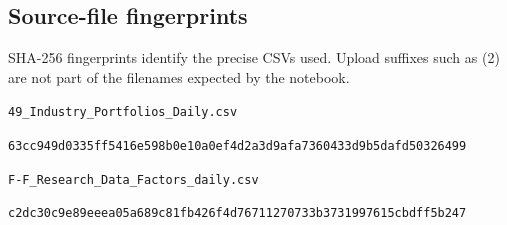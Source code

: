 \documentclass[11pt,a4paper]{article}
\begin{document}
\subsection*{Source-file fingerprints}
SHA-256 fingerprints identify the precise CSVs used. Upload suffixes such as (2) are not part of the filenames expected by the notebook.

{\footnotesize\texttt{49\_Industry\_Portfolios\_Daily.csv}\par\texttt{63cc949d0335ff5416e598b0e10a0ef4}\texttt{d2a3d9afa7360433d9b5dafd50326499}}\par
{\footnotesize\texttt{F-F\_Research\_Data\_Factors\_daily.csv}\par\texttt{c2dc30c9e89eeea05a689c81fb426f4d}\texttt{76711270733b3731997615cbdff5b247}}\par
\end{document}
